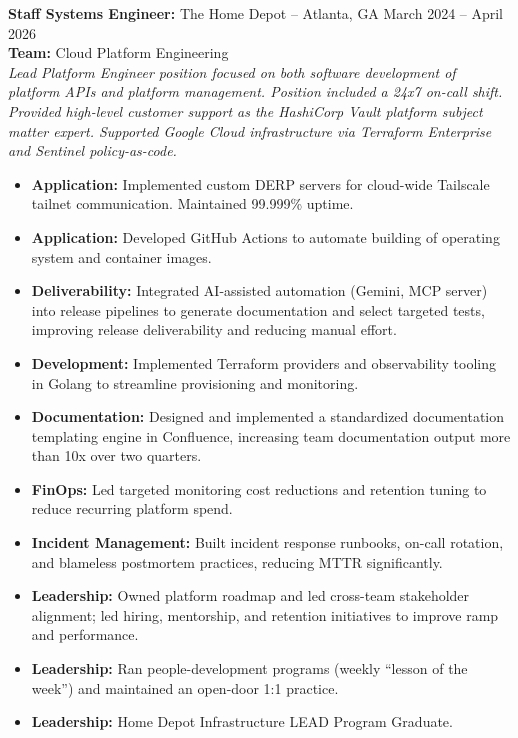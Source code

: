 \documentclass[11pt]{article}
\begin{document}
\begin{description}
\item\textbf{Staff Systems Engineer:} {The Home Depot} -- Atlanta, GA \hfill March 2024 -- April 2026 \\
\textbf{Team:} Cloud Platform Engineering \\
\textit{Lead Platform Engineer position focused on both software development of platform APIs and platform management. Position included a 24x7 on-call shift. Provided high-level customer support as the HashiCorp Vault platform subject matter expert. Supported Google Cloud infrastructure via Terraform Enterprise and Sentinel policy-as-code.} \\
\vspace{-6.5pt}
\begin{itemize}
  \item \textbf{Application:} Implemented custom DERP servers for cloud-wide Tailscale tailnet communication. Maintained 99.999\% uptime.
  \item \textbf{Application:} Developed GitHub Actions to automate building of operating system and container images.
  \item \textbf{Deliverability:} Integrated AI-assisted automation (Gemini, MCP server) into release pipelines to generate documentation and select targeted tests, improving release deliverability and reducing manual effort.
  \item \textbf{Development:} Implemented Terraform providers and observability tooling in Golang to streamline provisioning and monitoring.
  \item \textbf{Documentation:} Designed and implemented a standardized documentation templating engine in Confluence, increasing team documentation output more than 10x over two quarters.
  \item \textbf{FinOps:} Led targeted monitoring cost reductions and retention tuning to reduce recurring platform spend.
  \item \textbf{Incident Management:} Built incident response runbooks, on-call rotation, and blameless postmortem practices, reducing MTTR significantly.
  \item \textbf{Leadership:} Owned platform roadmap and led cross-team stakeholder alignment; led hiring, mentorship, and retention initiatives to improve ramp and performance.
  \item \textbf{Leadership:} Ran people-development programs (weekly ``lesson of the week'') and maintained an open-door 1:1 practice.
  \item \textbf{Leadership:} Home Depot Infrastructure LEAD Program Graduate.

\end{itemize}
\end{description}
\end{document}
